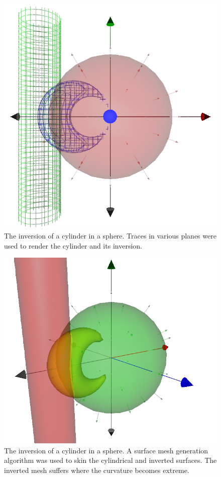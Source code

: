 \documentclass{birkjour}
\theoremstyle{definition}
\theoremstyle{remark}
\numberwithin{equation}{section}
\begin{document}
\begin{figure}
\includegraphics[scale=0.4]{InvertCylinderInSphereWire}
\caption{The inversion of a cylinder in a sphere.  Traces in various planes were
used to render the cylinder and its inversion.}
\label{fig_invert_cylinder_in_sphere}
\end{figure}
\begin{figure}
\includegraphics[scale=0.4]{InvertCylinderInSphereSolid}
\caption{The inversion of a cylinder in a sphere.  A surface mesh generation
algorithm was used to skin the cylindrical and inverted surfaces.  The inverted
mesh suffers where the curvature becomes extreme.}
\end{figure}
\end{document}
